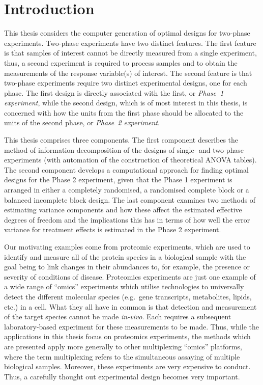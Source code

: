 \chapter{Introduction}\label{chap:intro}
This thesis considers the computer generation of optimal designs for two-phase experiments. Two-phase experiments have two distinct features. The first feature is that samples of interest cannot be directly measured from a single experiment, thus, a second experiment is required to process samples and to obtain the measurements of the response variable(s) of interest. The second feature is that two-phase experiments require two distinct experimental designs, one for each phase. The first design is directly associated with the first, or \emph{Phase~1 experiment}, while the second design, which is of most interest in this thesis, is concerned with how the units from the first phase should be allocated to the units of the second phase, or \emph{Phase~2 experiment}.

This thesis comprises three components. The first component describes the method of information decomposition of the designs of single- and two-phase experiments (with automation of the construction of theoretical ANOVA tables). The second component develops a computational approach for finding optimal designs for the Phase 2 experiment, given that the Phase 1 experiment is arranged in either a completely randomised, a randomised complete block or a balanced incomplete block design. The last component examines two methods of estimating variance components and how these affect the estimated effective degrees of freedom and the implications this has in terms of how well the error variance for treatment effects is estimated in the Phase 2 experiment. 

Our motivating examples come from proteomic experiments, which are used to identify and measure all of the protein species in a biological sample with the goal being to link changes in their abundances to, for example, the presence or severity of conditions of disease. Proteomics experiments are just one example of a wide range of ``omics'' experiments which utilise technologies to universally detect the different molecular species (e.g.\ gene transcripts, metabolites, lipids, etc.) in a cell. What they all have in common is that detection and measurement of the target species cannot be made \emph{in-vivo}. Each requires a subsequent laboratory-based experiment for these measurements to be made. Thus, while the applications in this thesis focus on proteomics experiments, the methods which are presented apply more generally to other multiplexing ``omics'' platforms, where the term multiplexing refers to the simultaneous assaying of multiple biological samples. Moreover, these experiments are very expensive to conduct. Thus, a carefully thought out experimental design becomes very important. 

